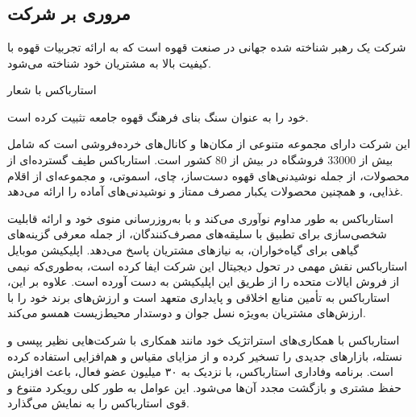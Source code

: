 \documentclass[dvipsnames, svgnames, x11names, 11pt, twocolumn]{article}
\begin{document}
\section{}
\subsection{مروری بر شرکت}
شرکت  یک رهبر شناخته شده جهانی در صنعت قهوه است که به ارائه تجربیات قهوه با کیفیت بالا به مشتریان خود شناخته می‌شود.

استارباکس با شعار

\noindent
\begin{minipage}[c]{.45\textwidth}
\raggedright
\textit{}
\end{minipage}%

 خود را به عنوان سنگ بنای فرهنگ قهوه جامعه تثبیت کرده است.


این شرکت دارای مجموعه متنوعی از مکان‌ها و کانال‌های خرده‌فروشی است که شامل بیش از 33000 فروشگاه در بیش از 80 کشور است. استارباکس طیف گسترده‌ای از محصولات، از جمله نوشیدنی‌های قهوه دست‌ساز، چای، اسموتی، و مجموعه‌ای از اقلام غذایی، و همچنین محصولات یکبار مصرف ممتاز و نوشیدنی‌های آماده را ارائه می‌دهد.

استارباکس به طور مداوم نوآوری می‌کند و با به‌روزرسانی منوی خود و ارائه قابلیت شخصی‌سازی برای تطبیق با سلیقه‌های مصرف‌کنندگان، از جمله معرفی گزینه‌های گیاهی برای گیاه‌خواران، به نیازهای مشتریان پاسخ می‌دهد. اپلیکیشن موبایل استارباکس نقش مهمی در تحول دیجیتال این شرکت ایفا کرده است، به‌طوری‌که نیمی از فروش ایالات متحده را از طریق این اپلیکیشن به دست آورده است. علاوه بر این، استارباکس به تأمین منابع اخلاقی و پایداری متعهد است و ارزش‌های برند خود را با ارزش‌های مشتریان به‌ویژه نسل جوان و دوستدار محیط‌زیست همسو می‌کند.

استارباکس با همکاری‌های استراتژیک خود مانند همکاری با شرکت‌هایی نظیر پپسی و نستله، بازارهای جدیدی را تسخیر کرده و از مزایای مقیاس و هم‌افزایی استفاده کرده است. برنامه وفاداری استارباکس، با نزدیک به ۳۰ میلیون عضو فعال، باعث افزایش حفظ مشتری و بازگشت مجدد آن‌ها می‌شود. این عوامل به طور کلی رویکرد متنوع و قوی استارباکس را به نمایش می‌گذارد.
\end{document}
